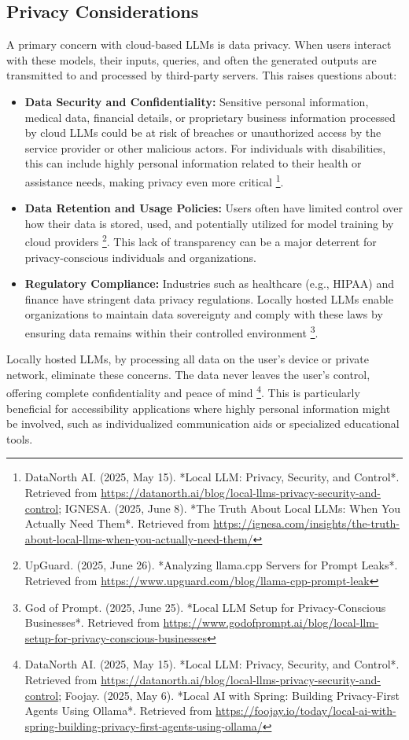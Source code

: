\subsection{Privacy Considerations}
A primary concern with cloud-based LLMs is data privacy. When users interact with these models, their inputs, queries, and often the generated outputs are transmitted to and processed by third-party servers. This raises questions about:
\begin{itemize}

    \item \textbf{Data Security and Confidentiality:} Sensitive personal information, medical data, financial details, or proprietary business information processed by cloud LLMs could be at risk of breaches or unauthorized access by the service provider or other malicious actors. For individuals with disabilities, this can include highly personal information related to their health or assistance needs, making privacy even more critical \footnote{DataNorth AI. (2025, May 15). *Local LLM: Privacy, Security, and Control*. Retrieved from \url{https://datanorth.ai/blog/local-llms-privacy-security-and-control}; IGNESA. (2025, June 8). *The Truth About Local LLMs: When You Actually Need Them*. Retrieved from \url{https://ignesa.com/insights/the-truth-about-local-llms-when-you-actually-need-them/}}.

    \item \textbf{Data Retention and Usage Policies:} Users often have limited control over how their data is stored, used, and potentially utilized for model training by cloud providers \footnote{UpGuard. (2025, June 26). *Analyzing llama.cpp Servers for Prompt Leaks*. Retrieved from \url{https://www.upguard.com/blog/llama-cpp-prompt-leak}}. This lack of transparency can be a major deterrent for privacy-conscious individuals and organizations.

    \item \textbf{Regulatory Compliance:} Industries such as healthcare (e.g., HIPAA) and finance have stringent data privacy regulations. Locally hosted LLMs enable organizations to maintain data sovereignty and comply with these laws by ensuring data remains within their controlled environment \footnote{God of Prompt. (2025, June 25). *Local LLM Setup for Privacy-Conscious Businesses*. Retrieved from \url{https://www.godofprompt.ai/blog/local-llm-setup-for-privacy-conscious-businesses}}.

\end{itemize}
Locally hosted LLMs, by processing all data on the user's device or private network, eliminate these concerns. The data never leaves the user's control, offering complete confidentiality and peace of mind \footnote{DataNorth AI. (2025, May 15). *Local LLM: Privacy, Security, and Control*. Retrieved from \url{https://datanorth.ai/blog/local-llms-privacy-security-and-control}; Foojay. (2025, May 6). *Local AI with Spring: Building Privacy-First Agents Using Ollama*. Retrieved from \url{https://foojay.io/today/local-ai-with-spring-building-privacy-first-agents-using-ollama/}}. This is particularly beneficial for accessibility applications where highly personal information might be involved, such as individualized communication aids or specialized educational tools.

